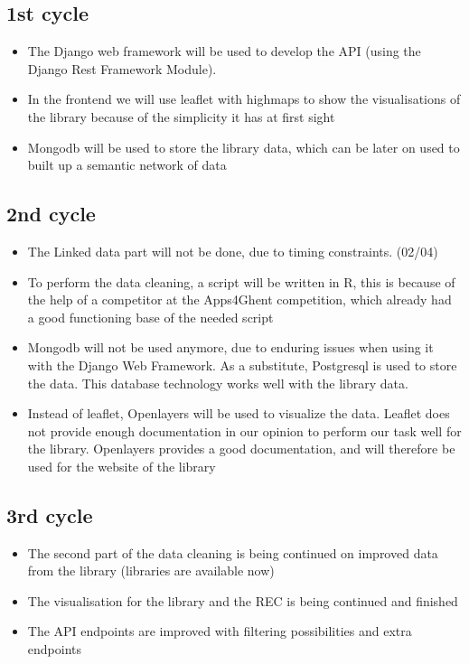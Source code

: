 \subsection{1st cycle}
	\begin{itemize} 
		\item The Django web framework will be used to develop the API (using the Django Rest Framework Module).
   	 	\item In the frontend we will use leaflet with highmaps to show the visualisations of the library because of the simplicity it has at first sight
		\item Mongodb will be used to store the library data, which can be later on used to built up a semantic network of data
	\end{itemize}
\subsection{2nd cycle}
	\begin{itemize}
		\item The Linked data part will not be done, due to timing constraints. (02/04)
		\item To perform the data cleaning, a script will be written in R, this is because of the help of a competitor at the Apps4Ghent competition, which already had a good functioning base of the needed script
		\item Mongodb will not be used anymore, due to enduring issues when using it with the Django Web Framework. As a substitute, Postgresql is used to store the data. This database technology works well with the library data.
		\item Instead of leaflet, Openlayers will be used to visualize the data. Leaflet does not provide enough documentation in our opinion to perform 		our task well for the library. Openlayers provides a good documentation, and will therefore be used for the website of the library
	\end{itemize}
\subsection{3rd cycle}
	\begin{itemize}
		\item The second part of the data cleaning is being continued on improved data from the library (libraries are available now)
		\item The visualisation for the library and the REC is being continued and finished
		\item The API endpoints are improved with filtering possibilities and extra endpoints
	\end{itemize}

